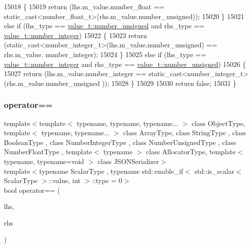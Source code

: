 \begin{DoxyCode}
15018         \{
15019             \textcolor{keywordflow}{return} (lhs.m\_value.number\_float == static\_cast<number\_float\_t>(rhs.m\_value.number\_unsigned));
15020         \}
15021         \textcolor{keywordflow}{else} \textcolor{keywordflow}{if} (lhs\_type == \hyperlink{namespacenlohmann_1_1detail_a1ed8fc6239da25abcaf681d30ace4985adce7cc8ec29055c4158828921f2f265e}{value\_t::number\_unsigned} and rhs\_type == 
      \hyperlink{namespacenlohmann_1_1detail_a1ed8fc6239da25abcaf681d30ace4985a5763da164f8659d94a56e29df64b4bcc}{value\_t::number\_integer})
15022         \{
15023             \textcolor{keywordflow}{return} (static\_cast<number\_integer\_t>(lhs.m\_value.number\_unsigned) == rhs.m\_value.
      number\_integer);
15024         \}
15025         \textcolor{keywordflow}{else} \textcolor{keywordflow}{if} (lhs\_type == \hyperlink{namespacenlohmann_1_1detail_a1ed8fc6239da25abcaf681d30ace4985a5763da164f8659d94a56e29df64b4bcc}{value\_t::number\_integer} and rhs\_type == 
      \hyperlink{namespacenlohmann_1_1detail_a1ed8fc6239da25abcaf681d30ace4985adce7cc8ec29055c4158828921f2f265e}{value\_t::number\_unsigned})
15026         \{
15027             \textcolor{keywordflow}{return} (lhs.m\_value.number\_integer == static\_cast<number\_integer\_t>(rhs.m\_value.number\_unsigned
      ));
15028         \}
15029 
15030         \textcolor{keywordflow}{return} \textcolor{keyword}{false};
15031     \}
\end{DoxyCode}
\mbox{\label{classnlohmann_1_1basic__json_aba21440ea1aff44f718285ed7d6d20d9}} 
\subsubsection{\texorpdfstring{operator==}{operator==}\hspace{0.1cm}{\footnotesize\ttfamily [2/3]}}
{\footnotesize\ttfamily template$<$template$<$ typename, typename, typename... $>$ class Object\+Type, template$<$ typename, typename... $>$ class Array\+Type, class String\+Type , class Boolean\+Type , class Number\+Integer\+Type , class Number\+Unsigned\+Type , class Number\+Float\+Type , template$<$ typename $>$ class Allocator\+Type, template$<$ typename, typename=void $>$ class J\+S\+O\+N\+Serializer$>$ \\
template$<$typename Scalar\+Type , typename std\+::enable\+\_\+if$<$ std\+::is\+\_\+scalar$<$ Scalar\+Type $>$\+::value, int $>$\+::type  = 0$>$ \\
bool operator== (\begin{DoxyParamCaption}\item[{\hyperlink{classnlohmann_1_1basic__json_a4057c5425f4faacfe39a8046871786ca}{const\+\_\+reference}}]{lhs,  }\item[{const Scalar\+Type}]{rhs }\end{DoxyParamCaption})\hspace{0.3cm}{\ttfamily [friend]}}



